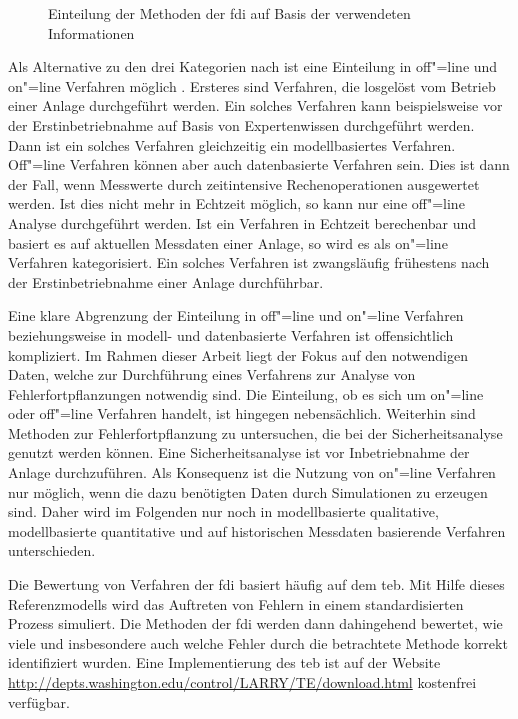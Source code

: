 \begin{figure}[h!tb]
\centering
	
	\caption[Unterteilung der Methoden zur Fehlerdiagnose und -identifikation]{Einteilung der Methoden der \ac{fdi} auf Basis der verwendeten Informationen}
	\label{fig:fAna_fidKategorien}
\end{figure}

Als Alternative zu den drei Kategorien nach \citeauthor{Venkatasubramanian_2003}\cite{Venkatasubramanian_2003} ist eine Einteilung in off"=line und on"=line Verfahren m\"oglich \cite{Kavcic_2001}. Ersteres sind Verfahren, die losgel\"ost vom Betrieb einer Anlage durchgef\"uhrt werden. Ein solches Verfahren kann beispielsweise vor der Erstinbetriebnahme auf Basis von Expertenwissen durchgef\"uhrt werden. Dann ist ein solches Verfahren gleichzeitig ein modellbasiertes Verfahren. Off"=line Verfahren k\"onnen aber auch datenbasierte Verfahren sein. Dies ist dann der Fall, wenn Messwerte durch zeitintensive Rechenoperationen ausgewertet werden. Ist dies nicht mehr in Echtzeit m\"oglich, so kann nur eine off"=line Analyse durchgef\"uhrt werden. \newline 
Ist ein Verfahren in Echtzeit berechenbar und basiert es auf aktuellen Messdaten einer Anlage, so wird es als on"=line Verfahren kategorisiert. Ein solches Verfahren ist zwangsl\"aufig fr\"uhestens nach der Erstinbetriebnahme einer Anlage durchf\"uhrbar. 

Eine klare Abgrenzung der Einteilung in off"=line und on"=line Verfahren beziehungsweise in modell- und datenbasierte Verfahren ist offensichtlich kompliziert. Im Rahmen dieser Arbeit liegt der Fokus auf den notwendigen Daten, welche zur Durchf\"uhrung eines Verfahrens zur Analyse von Fehlerfortpflanzungen notwendig sind. Die Einteilung, ob es sich um on"=line oder off"=line Verfahren handelt, ist hingegen nebens\"achlich. Weiterhin sind Methoden zur Fehlerfortpflanzung zu untersuchen, die bei der Sicherheitsanalyse genutzt werden k\"onnen. Eine Sicherheitsanalyse ist vor Inbetriebnahme der Anlage durchzuf\"uhren. Als Konsequenz ist die Nutzung von on"=line Verfahren nur m\"oglich, wenn die dazu ben\"otigten Daten durch Simulationen zu erzeugen sind. Daher wird im Folgenden nur noch in modellbasierte qualitative, modellbasierte quantitative und auf historischen Messdaten basierende Verfahren unterschieden. 

Die Bewertung von Verfahren der \ac{fdi} basiert h\"aufig auf dem \ac{teb}. Mit Hilfe dieses Referenzmodells wird das Auftreten von Fehlern in einem standardisierten Prozess simuliert. Die Methoden der \ac{fdi} werden dann dahingehend bewertet, wie viele und insbesondere auch welche Fehler durch die betrachtete Methode korrekt identifiziert wurden. Eine Implementierung des \ac{teb} ist auf der Website \url{http://depts.washington.edu/control/LARRY/TE/download.html} kostenfrei verf\"ugbar.  

